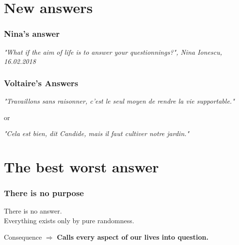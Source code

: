 \documentclass{beamer}
\begin{document}
    \section{New answers} %
    \begin{frame}
    		\frametitle{Nina's answer}
    		
    		\textit{"What if the aim of life is to answer your questionnings?", Nina Ionescu, 16.02.2018}
    \end{frame}
    \begin{frame}
    		\frametitle{Voltaire's Answers}
    		
    		\textit{"Travaillons sans raisonner, c'est le seul moyen de rendre la vie supportable."} \pause
    		\begin{center}
    		or \pause
    		\end{center}
    		\textit{"Cela est bien, dit Candide, mais il faut cultiver notre jardin."}
    		
    \end{frame}
    
    \section{The best worst answer}
    
    \begin{frame}
    		\frametitle{There is no purpose}
    		There is no answer. \\ \pause
    		Everything exists only by pure randomness. \\ \pause
    		\begin{alertblock}{Consequence}
    			$\Rightarrow$ \textbf{Calls every aspect of our lives into question.}
			\end{alertblock}
    		
    		
    \end{frame}
    
\end{document}
